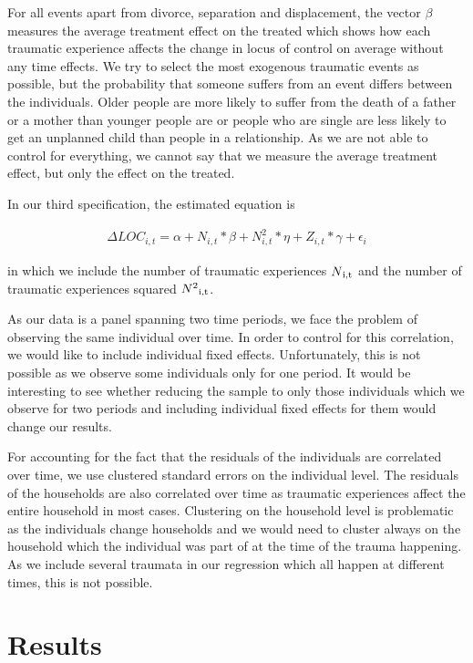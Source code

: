 \documentclass[12pt, a4paper, fleqn, parskip]{scrartcl}
\begin{document}
For all events apart from divorce, separation and displacement, the vector $\beta$
measures the average treatment effect on the treated which shows how each traumatic
experience affects the change in locus of control on average without any time effects.
We try to select the most exogenous traumatic events as possible, but the probability
that someone suffers from an event differs between the individuals. Older people are
more likely to suffer from the death of a father or a mother than younger people are or
people who are single are less likely to get an unplanned child than people in a
relationship. As we are not able to control for everything, we cannot say that we
measure the average treatment effect, but only the effect on the treated.

In our third specification, the estimated equation is

\begin{align}
    \Delta LOC_{i,t}= \alpha + N_{i,t} * \beta + N^{2}_{i,t} * \eta + Z_{i,t} *
    \gamma + \epsilon_{i}
\end{align}

in which we include the number of traumatic experiences $N \textsubscript{i,t}$ and the
number of traumatic experiences squared $N \textsuperscript{2}\textsubscript{i,t}$.

As our data is a panel spanning two time periods, we face the problem of observing the
same individual over time. In order to control for this correlation, we would like to
include individual fixed effects. Unfortunately, this is not possible as we observe some
individuals only for one period. It would be interesting to see whether reducing the
sample to only those individuals which we observe for two periods and including
individual fixed effects for them would change our results.

For accounting for the fact that the residuals of the individuals are correlated over
time, we use clustered standard errors on the individual level. The residuals of the
households are also correlated over time as traumatic experiences affect the entire
household in most cases. Clustering on the household level is problematic as the
individuals change households and we would need to cluster always on the household which
the individual was part of at the time of the trauma happening. As we include several
traumata in our regression which all happen at different times, this is not possible.

\section{Results} %
\label{sec:results}
\end{document}
